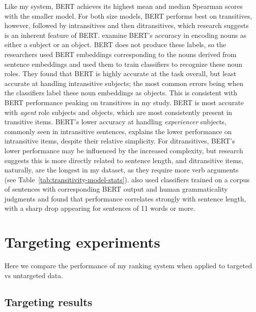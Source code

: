 Like my system, BERT achieves its highest mean and median Spearman scores with the smaller model. For both size models, BERT performs best on transitives, however, followed by intransitives and then ditransitives, which research suggests is an inherent feature of BERT. \citet{papadimitriou2021multilingual} examine BERT's accuracy in encoding nouns as either a subject or an object. BERT does not produce these labels, so the researchers used BERT embeddings corresponding to the nouns derived from sentence embeddings and used them to train classifiers to recognize these noun roles. They found that BERT is highly accurate at the task overall, but least accurate at handling intransitive subjects; the most common errors being when the classifiers label these noun embeddings as objects. This is consistent with BERT performance peaking on transitives in my study. BERT is most accurate with \textit{agent} role subjects and objects, which are most consistently present in transitive items. BERT's lower accuracy at handling \textit{experiencer} subjects, commonly seen in intransitive sentences, explains the lower performance on intransitive items, despite their relative simplicity. For ditransitives, BERT's lower performance may be influenced by the increased complexity, but research suggests this is more directly related to sentence length, and ditransitive items, naturally, are the longest in my dataset, as they require more verb arguments (see Table~\ref{tab:transitivity-model-stats}). \citet{warstadt2019} also used classifiers trained on a corpus of sentences with corresponding BERT output and human grammaticality judgments and found that performance correlates strongly with sentence length, with a sharp drop appearing for sentences of 11 words or more.

\section{Targeting experiments}
\label{sec:exp-targeting}
Here we compare the performance of my ranking system when applied to targeted vs untargeted data.
\subsection{Targeting results}
\label{sec:targeting-results}

